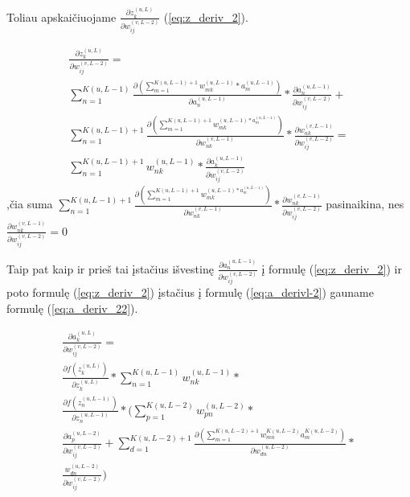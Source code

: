 Toliau apskaičiuojame \begin{math}\frac{\partial z_k^{(u,L)}}{\partial w_{ij}^{(v,L-2)}}\end{math} (\ref{eq:z_deriv_2}).

\begin{equation} \label{eq:z_deriv_2}
  \begin{aligned}
    \frac{\partial z_k^{(u,L)}}{\partial w_{ij}^{(v,L-2)}} = \\
    \sum_{n=1}^{K(u, L-1)} \frac{\partial (\sum_{m=1}^{K(u,L-1)+1} w_{mk}^{(u,L-1)} * a_m^{(u,L-1)} )}{\partial a_n^{(u,L-1)}} *
    \frac{\partial a_n^{(u,L-1)}}{\partial w_{ij}^{(v,L-2)}}   +\\
    \sum_{n=1}^{K(u, L-1)+1} \frac{\partial (\sum_{m=1}^{K(u,L-1)+1} w_{mk}^{(u,L-1) * a_m^{(u,L-1)}} )}{\partial w_{nk}^{(v,L-1)}} *
    \frac{\partial w_{nk}^{(v,L-1)}}{\partial w_{ij}^{(v,L-2)}} = \\
    \sum_{n=1}^{K(u, L-1)+1} w_{nk}^{(u,L-1)} *   \frac{\partial a_k^{(u, L-1)}}{\partial w_{ij}^{(v,L-2)}}
  \end{aligned}
\end{equation}
,čia suma \begin{math}\sum_{n=1}^{K(u, L-1)+1} \frac{\partial (\sum_{m=1}^{K(u,L-1)+1} w_{mk}^{(u,L-1) * a_m^{(u,L-1)}} )}{\partial w_{nk}^{(v,L-1)}} *
\frac{\partial w_{nk}^{(v,L-1)}}{\partial w_{ij}^{(v,L-2)}}\end{math} pasinaikina, nes \begin{math}\frac{\partial w_{nk}^{(v,L-1)}}{\partial w_{ij}^{(v,L-2)}}=0\end{math}

Taip pat kaip ir prieš tai įstačius išvestinę \begin{math}\frac{\partial a_n^{(u,L-1)}}{\partial w_{ij}^{(v,L-2)}}\end{math} į formulę (\ref{eq:z_deriv_2}) ir poto formulę (\ref{eq:z_deriv_2}) įstačius į formulę (\ref{eq:a_derivl-2}) gauname formulę (\ref{eq:a_deriv_22}).


\begin{equation}\label{eq:a_deriv_22}
  \begin{aligned}
  \frac{\partial a_k^{(u, L)}}{\partial w_{ij}^{(v,L-2)}} = \\
  \frac{\partial f(z_k^{(u, L)})}{\partial z_k^{(u,L)}} *
  \sum_{n=1}^{K(u, L-1)} w_{nk}^{(u,L-1)} *\\
  \frac{\partial f(z_n^{(u, L-1)})}{\partial z_n^{(u,L-1)}}
  *
  (\sum_{p=1}^{K(u, L-2)} w_{pn}^{(u,L-2)} *\\
  \frac{\partial a_p^{(u,L-2)}}{\partial w_{ij}^{(v,L-2)}} +
 \sum_{d=1}^{K(u,L-2)+1} \frac{\partial (\sum_{m=1}^{K(u,L-2)+1} w_{mn}^{K(u,L-2)} a_m^{K(u,L-2)})}{\partial w_{dn}^{(u,L-2)}} *\\
\frac{w_{dn}^{(u,L-2)}}{\partial w_{ij}^{(v,L-2)}})
  \end{aligned}
\end{equation}






